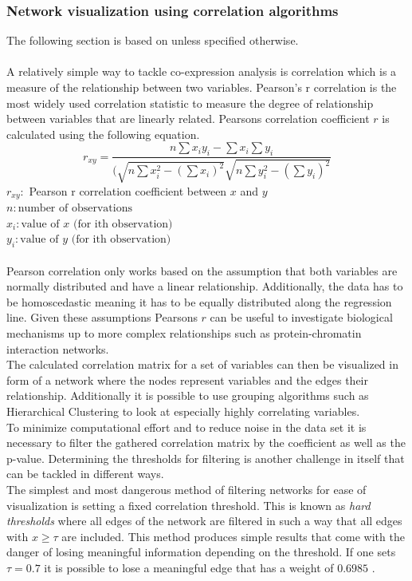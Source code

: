 \subsubsection{Network visualization using correlation algorithms}
The following section is based on \cite{Dytham.2011} unless specified otherwise.\\\\
A relatively simple way to tackle co-expression analysis is correlation which is a measure of the relationship between two variables. Pearson's r correlation is the most widely used correlation statistic to measure the degree of relationship between variables that are linearly related. Pearsons correlation coefficient $r$ is calculated using the following equation.\\
\begin{equation}
    r_{xy} = \frac{n\sum x_i y_i - \sum x_i \sum y_i}{(\sqrt{n\sum x_i^2-(\sum x_i)^2}\sqrt{n\sum y_i^2-(\sum y_i)^2}}
\end{equation}
$r_{xy}:$ Pearson r correlation coefficient between $x$ and $y$\\
$n:\text{number of observations}$\\
$x_i:\text{value of $x$ (for ith observation)}$\\
$y_i:\text{value of $y$ (for ith observation)}$\\
\\
Pearson correlation only works based on the assumption that both variables are normally distributed and have a linear relationship. Additionally, the data has to be homoscedastic meaning it has to be equally distributed along the regression line. Given these assumptions Pearsons $r$ can be useful to investigate biological mechanisms up to more complex relationships such as protein-chromatin interaction networks.\\
The calculated correlation matrix for a set of variables can then be visualized in form of a network where the nodes represent variables and the edges their relationship. Additionally it is possible to use grouping algorithms such as Hierarchical Clustering to look at especially highly correlating variables.\\
To minimize computational effort and to reduce noise in the data set it is necessary to filter the gathered correlation matrix by the coefficient as well as the p-value. Determining the thresholds for filtering is another challenge in itself that can be tackled in different ways.\\
The simplest and most dangerous method of filtering networks for ease of visualization is setting a fixed correlation threshold. This is known as \textit{hard thresholds} where all edges of the network are filtered in such a way that all edges with $x \geq \tau$ are included. This method produces simple results that come with the danger of losing meaningful information depending on the threshold. If one sets $\tau = 0.7$ it is possible to lose a meaningful edge that has a weight of $0.6985$ \citep{Carter.2004}.\\
